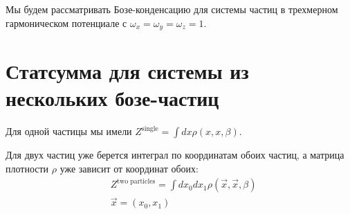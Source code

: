 \begin{lecture}
    Мы будем рассматривать Бозе-конденсацию для системы частиц в трехмерном гармоническом потенциале с $\omega_x = \omega_y = \omega_z = 1$.
    \section{Статсумма для системы из нескольких бозе-частиц}
    Для одной частицы мы имели $Z^{\text{single}} = \int dx \rho (x, x, \beta)$.

    Для двух частиц уже берется интеграл по координатам обоих частиц, а матрица плотности $\rho$ уже зависит от координат обоих:
    \begin{align}
        & Z^{\text{two particles}} = \int dx_0 dx_1 \rho (\vec{x}, \vec{x}, \beta) \\
        & \vec{x} = (x_0, x_1)
    \end{align}


\end{lecture}
